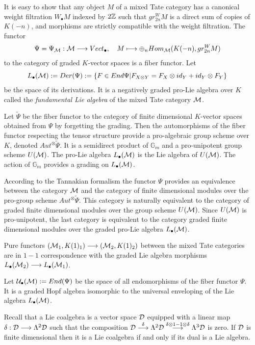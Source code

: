 \documentclass[10pt]{article}
\begin{document}
It is easy to show that any object $M$ of a mixed Tate category has a canonical 
weight filtration $W_{\bullet}M$ indexed by $2{\mathbb Z}$ 
such that $gr^W_{2n}M$ is a direct sum of copies of $K(-n)$, and 
morphisms are strictly compatible with the weight filtration. The functor
$$
\Psi = \Psi_{{\cal M}}:  {\cal M} \longrightarrow Vect_{\bullet}, \quad M \longmapsto 
\oplus_{n} Hom_{{\cal M}}(K(-n), gr^W_{2n}M)
$$
  to the category of graded $K$-vector spaces is a fiber functor. Let 
$$
L_{\bullet}({\cal M}):= Der ( \Psi) : = \{F \in End \Psi | F_{X \otimes Y} = F_{X} 
\otimes id_{Y} +  id_{Y} \otimes F_{Y}\}
$$  
be the space of its derivations. 
It is a negatively graded pro-Lie algebra over $K$ called 
 the {\it fundamental Lie algebra} of the mixed Tate category ${\cal M}$. 

Let $\widetilde \Psi$ be the fiber functor to the category of finite dimensional 
$K$-vector spaces obtained from $\Psi$ by forgetting the grading. Then the automorphisms of the fiber functor 
respecting the tensor structure provide 
a pro-algebraic group scheme over $K$, denoted 
$ Aut^{\otimes} \widetilde \Psi$. It is a semidirect product of ${\mathbb G}_m$ 
and a pro-unipotent group scheme 
$U({\cal M})$. The pro-Lie algebra $L_{\bullet}({\cal M})$ is the 
Lie algebra of  $U({\cal M})$. The action of ${\mathbb G}_m$ provides 
a grading on $L_{\bullet}({\cal M})$. 

According to the Tannakian formalism the functor $\Psi$ provides an equivalence 
between the category $\cal M$ and 
 the category of finite dimensional modules over the
pro-group scheme $ Aut^{\otimes} \widetilde \Psi$.  This category is naturally equivalent 
to the category of graded finite dimensional modules over the group scheme $U({\cal M})$.
 Since $U({\cal M})$ is  pro-unipotent,  the last category is equivalent  to the category 
graded finite dimensional modules over the
graded pro-Lie algebra $L_{\bullet}({\cal M})$.  

Pure functors  $({\cal M}_1, K(1)_1)  \longrightarrow ({\cal M}_2, K(1)_2)$ between the mixed Tate categories 
 are in $1-1$ correspondence with the graded Lie algebra 
morphisms  $L_{\bullet}({\cal M}_2) \longrightarrow L_{\bullet}({\cal M}_1)$. 

 Let  ${\cal U}_{\bullet}({\cal M}):= End(\Psi)$ be the space of all endomorphisms of the 
fiber functor $\Psi$. It is a graded 
Hopf algebra isomorphic to the universal enveloping 
of the Lie algebra $L_{\bullet}({\cal M})$. 

Recall that a Lie coalgebra is a vector 
space ${\cal D}$ equipped with a linear map 
$
\delta:  {\cal D} \longrightarrow \Lambda^2{\cal D} 
$
such that the composition 
$
{\cal D} \stackrel{\delta}{\longrightarrow}\Lambda^2{\cal D} \stackrel{\delta \otimes 1 - 1 \otimes 
\delta}{\longrightarrow}
\Lambda^3{\cal D} 
$ 
is zero. If ${\cal D} $ is finite dimensional then it is a Lie coalgebra if 
and only if its dual is a Lie algebra.  
\end{document}
